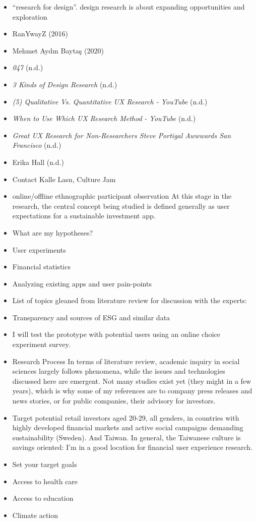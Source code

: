 \documentclass[
  letterpaper,
  DIV=11,
  numbers=noendperiod]{scrartcl}
\begin{document}
\begin{itemize}
\item
  ``research for design''. design research is about expanding
  opportunities and exploration
\item
  RanYwayZ (2016)
\item
  Mehmet Aydın Baytaş (2020)
\item
  \emph{047} (n.d.)
\item
  \emph{3 {Kinds} of {Design Research}} (n.d.)
\item
  \emph{(5) {Qualitative} Vs. {Quantitative UX Research} - {YouTube}}
  (n.d.)
\item
  \emph{When to {Use Which UX Research Method} - {YouTube}} (n.d.)
\item
  \emph{Great {UX Research} for {Non-Researchers} {\textbar} {Steve
  Portigal} {\textbar} {Awwwards San Francisco}} (n.d.)
\item
  Erika Hall (n.d.)
\item
  Contact Kalle Lasn, Culture Jam
\item
  online/offline ethnographic participant observation At this stage in
  the research, the central concept being studied is defined generally
  as user expectations for a sustainable investment app.
\item
  What are my hypotheses?
\item
  User experiments
\item
  Financial statistics
\item
  Analyzing existing apps and user pain-points
\item
  List of topics gleaned from literature review for discussion with the
  experts:
\item
  Transparency and sources of ESG and similar data
\item
  I will test the prototype with potential users using an online choice
  experiment survey.
\item
  Research Process In terms of literature review, academic inquiry in
  social sciences largely follows phenomena, while the issues and
  technologies discussed here are emergent. Not many studies exist yet
  (they might in a few years), which is why some of my references are to
  company press releases and news stories, or for public companies,
  their advisory for investors.
\item
  Target potential retail investors aged 20-29, all genders, in
  countries with highly developed financial markets and active social
  campaigns demanding sustainability (Sweden). And Taiwan. In general,
  the Taiwanese culture is savings oriented: I'm in a good location for
  financial user experience research.
\item
  Set your target goals
\item
  Access to health care
\item
  Access to education
\item
  Climate action
\end{itemize}
\end{document}
